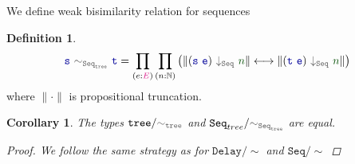 \documentclass[twoside,11pt,openright]{report}
\theoremstyle{plain} %
\newtheorem*{cor}{Corollary}
\theoremstyle{definition}
\newtheorem{defn}[thm]{Definition}%
\theoremstyle{remark}
\newcommand*{\term}[1]{\textcolor{green!30!black}{#1}} %
\newcommand*{\type}[1]{\textcolor{magenta!90!black}{#1}}
\newcommand*{\relation}[1]{\textcolor{gray!75!black}{\ensuremath{\mathtt{#1}}}}
\newcommand*{\function}[1]{\textcolor{blue!60!black}{\ensuremath{\mathtt{#1}}}}
\newcommand*{\typeformer}[1]{\ensuremath{\mathtt{#1}}}
\begin{document}
We define weak bisimilarity relation for sequences 
\begin{defn}
  \begin{equation}
    \function{s}~\relation{\sim_{\typeformer{Seq}_{tree}}}~\function{t} = \prod_{(e : \type{E})} \prod_{(n : \mathbb{N})} \left(\|(\function{s}~\function{e})~\relation{\downarrow_{\mathtt{Seq}}}~\term{n}\| \longleftrightarrow \| (\function{t}~\function{e})~\relation{\downarrow_{\mathtt{Seq}}}~\term{n}\|\right)
  \end{equation}
  where \(\| \cdot \|\) is propositional truncation.
\end{defn}
\begin{cor}
  The types \(\typeformer{tree}/\relation{\sim_{tree}}\) and \(\typeformer{Seq}_{tree} / \relation{\sim_{\typeformer{Seq}_{tree}}}\) are equal.
  \begin{proof}
    We follow the same strategy as for \(\typeformer{Delay}/{\sim}\) and \(\typeformer{Seq}/{\sim}\)
  \end{proof}
\end{cor}
\end{document}
